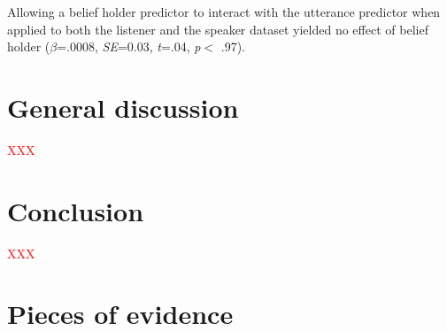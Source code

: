 \documentclass[11pt]{article}
\newcommand{\red}[1]{\textcolor{Red}{#1}}
\begin{document}
Allowing a belief holder predictor to interact with the utterance predictor when applied to both the listener and the speaker dataset yielded no effect of belief holder ($\beta$=.0008, \emph{SE}=0.03, \emph{t}=.04, \emph{p}$<$ .97).

\section{General discussion}

\red{XXX}


%
%
%

\section{Conclusion}

\red{XXX}

\appendix

\section{Pieces of evidence}
\label{sec:evidence}
\end{document}
